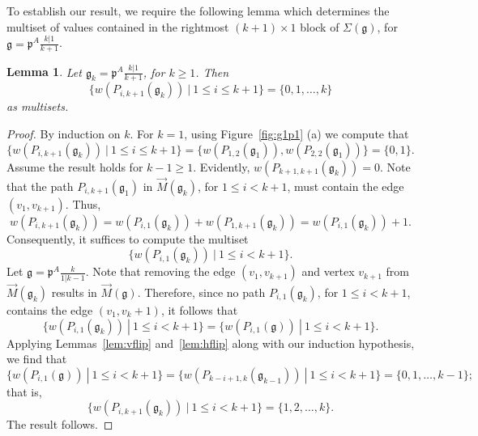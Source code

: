 \documentclass[letterpaper,10pt]{article}
\newtheorem{lemma}[theorem]{Lemma}
\begin{document}
To establish our result, we require the following lemma which determines the multiset of values contained in the rightmost $(k+1)\times 1$ block of $\Sigma(\mathfrak{g})$, for $\mathfrak{g}=\mathfrak{p}^A\frac{k|1}{k+1}$.

\begin{lemma}\label{lem:tailk1}
Let $\mathfrak{g}_k=\mathfrak{p}^A\frac{k|1}{k+1}$, for $k\ge 1$. Then $$\{w(P_{i,k+1}(\mathfrak{g}_k))~|~1\le i\le k+1\}=\{0,1,\hdots,k\}$$ as multisets.
\end{lemma}
\begin{proof}
By induction on $k$. For $k=1$, using Figure~\ref{fig:g1p1} (a) we compute that $$\{w(P_{i,k+1}(\mathfrak{g}_k))~|~1\le i\le k+1\}=\{w(P_{1,2}(\mathfrak{g}_1)),w(P_{2,2}(\mathfrak{g}_1))\}=\{0,1\}.$$ Assume the result holds for $k-1\ge 1$. Evidently, $w(P_{k+1,k+1}(\mathfrak{g}_k))=0$. Note that the path $P_{i,k+1}(\mathfrak{g}_1)$ in $\overrightarrow{M}(\mathfrak{g}_k)$, for $1\le i<k+1$, must contain the edge $(v_1,v_{k+1})$. Thus, $$w(P_{i,k+1}(\mathfrak{g}_k))=w(P_{i,1}(\mathfrak{g}_k))+w(P_{1,k+1}(\mathfrak{g}_k))=w(P_{i,1}(\mathfrak{g}_k))+1.$$ Consequently, it suffices to compute the multiset $$\{w(P_{i,1}(\mathfrak{g}_k))~|~1\le i< k+1\}.$$ Let $\mathfrak{g}=\mathfrak{p}^A\frac{k}{1|k-1}$. Note that removing the edge $(v_1,v_{k+1})$ and vertex $v_{k+1}$ from $\overrightarrow{M}(\mathfrak{g}_k)$ results in $\overrightarrow{M}(\mathfrak{g})$. Therefore, since no path $P_{i,1}(\mathfrak{g}_k)$, for $1\le i<k+1$, contains the edge $(v_1,v_k+1)$, it follows that $$\{w(P_{i,1}(\mathfrak{g}_k))~|~1\le i<k+1\}=\{w(P_{i,1}(\mathfrak{g}))~|~1\le i<k+1\}.$$ Applying Lemmas~\ref{lem:vflip} and~\ref{lem:hflip} along with our induction hypothesis, we find that $$\{w(P_{i,1}(\mathfrak{g}))~|~1\le i<k+1\}=\{w(P_{k-i+1,k}(\mathfrak{g}_{k-1}))~|~1\le i<k+1\}=\{0,1,\hdots,k-1\};$$ that is, $$\{w(P_{i,k+1}(\mathfrak{g}_{k}))~|~1\le i<k+1\}=\{1,2,\hdots,k\}.$$ The result follows.
\end{proof}
\end{document}
